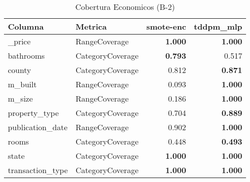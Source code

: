 \begin{table}[H]
\centering
\caption{Cobertura Economicos (B-2)}
\label{table-coverage-economicos-b-2}
\begin{tabular}{|l|l|r|r|}
\hline
\rowcolor[gray]{0.8}
Columna & Metrica & smote-enc & tddpm\_mlp \\
\hline \_price & RangeCoverage & \bfseries 1.000 & \bfseries 1.000 \\
\hline bathrooms & CategoryCoverage & \bfseries 0.793 & 0.517 \\
\hline county & CategoryCoverage & 0.812 & \bfseries 0.871 \\
\hline m\_built & RangeCoverage & 0.093 & \bfseries 1.000 \\
\hline m\_size & RangeCoverage & 0.186 & \bfseries 1.000 \\
\hline property\_type & CategoryCoverage & 0.704 & \bfseries 0.889 \\
\hline publication\_date & RangeCoverage & 0.902 & \bfseries 1.000 \\
\hline rooms & CategoryCoverage & 0.448 & \bfseries 0.493 \\
\hline state & CategoryCoverage & \bfseries 1.000 & \bfseries 1.000 \\
\hline transaction\_type & CategoryCoverage & \bfseries 1.000 & \bfseries 1.000 \\
\hline
\end{tabular}
\end{table}
